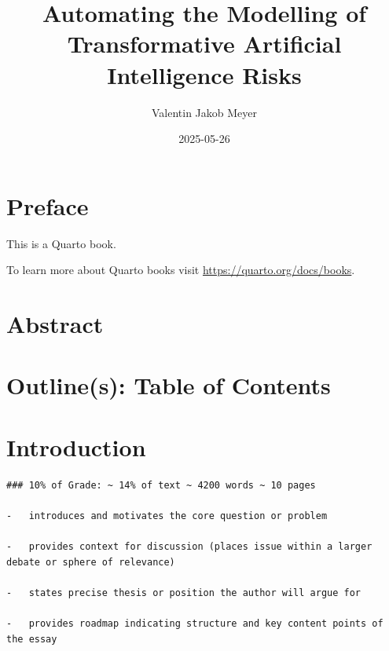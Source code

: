 \documentclass[
  letterpaper,
]{book}
\title{Automating the Modelling of Transformative Artificial
Intelligence Risks}
\author{Valentin Jakob Meyer}
\date{2025-05-26}
\renewcommand*\contentsname{Table of contents}
\newcommand\contentsname{Table of contents}
\begin{document}
\frontmatter
\maketitle

\renewcommand*\contentsname{Table of contents}
{
\setcounter{tocdepth}{2}
\tableofcontents
}

\mainmatter
{}

\chapter*{Preface}\label{preface}


This is a Quarto book.

To learn more about Quarto books visit
\url{https://quarto.org/docs/books}.


\chapter*{Abstract}\label{sec-Abstract}



\chapter*{Outline(s): Table of Contents}\label{sec-ToC}



\chapter{Introduction}\label{introduction}

\begin{verbatim}
### 10% of Grade: ~ 14% of text ~ 4200 words ~ 10 pages

-   introduces and motivates the core question or problem

-   provides context for discussion (places issue within a larger debate or sphere of relevance)

-   states precise thesis or position the author will argue for

-   provides roadmap indicating structure and key content points of the essay
\end{verbatim}
\end{document}
